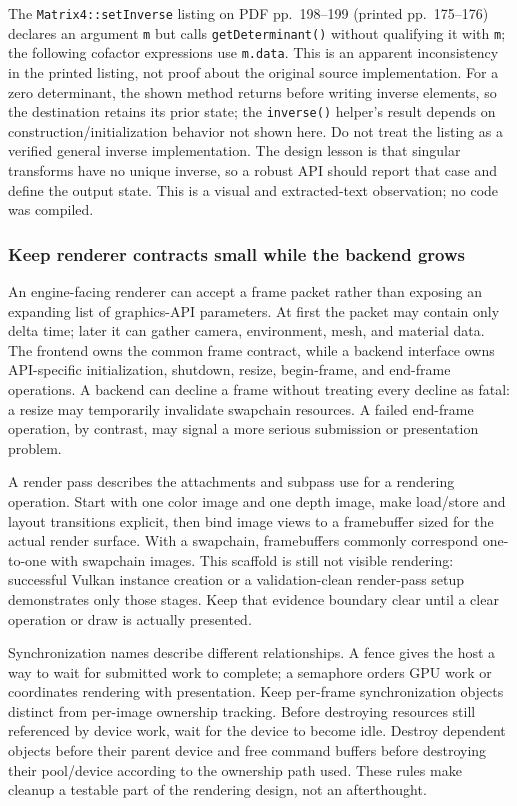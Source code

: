 The \texttt{Matrix4::setInverse} listing on PDF pp.~198--199 (printed pp.~175--176) declares an argument \texttt{m} but calls \texttt{getDeterminant()} without qualifying it with \texttt{m}; the following cofactor expressions use \texttt{m.data}. This is an apparent inconsistency in the printed listing, not proof about the original source implementation. For a zero determinant, the shown method returns before writing inverse elements, so the destination retains its prior state; the \texttt{inverse()} helper's result depends on construction/initialization behavior not shown here. Do not treat the listing as a verified general inverse implementation. The design lesson is that singular transforms have no unique inverse, so a robust API should report that case and define the output state. This is a visual and extracted-text observation; no code was compiled.

\subsubsection{Keep renderer contracts small while the backend grows}\label{06-engine-ii-ch025-keep-renderer-contracts-small-while-the-backend-grows}

An engine-facing renderer can accept a frame packet rather than exposing an expanding list of graphics-API parameters. At first the packet may contain only delta time; later it can gather camera, environment, mesh, and material data. The frontend owns the common frame contract, while a backend interface owns API-specific initialization, shutdown, resize, begin-frame, and end-frame operations. A backend can decline a frame without treating every decline as fatal: a resize may temporarily invalidate swapchain resources. A failed end-frame operation, by contrast, may signal a more serious submission or presentation problem.

A render pass describes the attachments and subpass use for a rendering operation. Start with one color image and one depth image, make load/store and layout transitions explicit, then bind image views to a framebuffer sized for the actual render surface. With a swapchain, framebuffers commonly correspond one-to-one with swapchain images. This scaffold is still not visible rendering: successful Vulkan instance creation or a validation-clean render-pass setup demonstrates only those stages. Keep that evidence boundary clear until a clear operation or draw is actually presented.

Synchronization names describe different relationships. A fence gives the host a way to wait for submitted work to complete; a semaphore orders GPU work or coordinates rendering with presentation. Keep per-frame synchronization objects distinct from per-image ownership tracking. Before destroying resources still referenced by device work, wait for the device to become idle. Destroy dependent objects before their parent device and free command buffers before destroying their pool/device according to the ownership path used. These rules make cleanup a testable part of the rendering design, not an afterthought.

